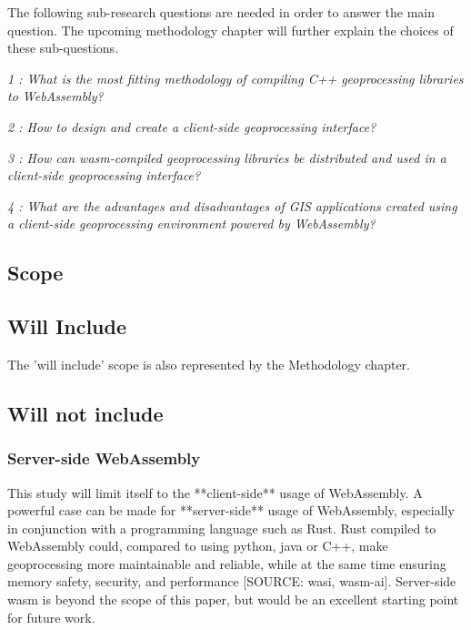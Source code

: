 The following sub-research questions are needed in order to answer the main question. The upcoming methodology chapter will further explain the choices of these sub-questions. 

\textit{1 : What is the most fitting methodology of compiling C++ geoprocessing libraries to WebAssembly?}

\textit{2 : How to design and create a client-side geoprocessing interface?}

\textit{3 : How can wasm-compiled geoprocessing libraries be distributed and used in a client-side geoprocessing interface?}

\textit{4 : What are the advantages and disadvantages of GIS applications created using a client-side geoprocessing environment powered by WebAssembly?}

\newpage
\subsection{Scope}


\subsection*{Will Include}

The 'will include' scope is also represented by the Methodology chapter. 

\subsection*{Will not include}

\subsubsection*{Server-side WebAssembly} %

This study will limit itself to the **client-side** usage of WebAssembly. 
A powerful case can be made for **server-side** usage of WebAssembly, especially in conjunction with a programming language such as Rust. 
Rust compiled to WebAssembly could, compared to using python, java or C++, make geoprocessing more maintainable and reliable, while at the same time ensuring memory safety, security, and performance [SOURCE: wasi, wasm-ai]. 
Server-side wasm is beyond the scope of this paper, but would be an excellent starting point for future work. 

